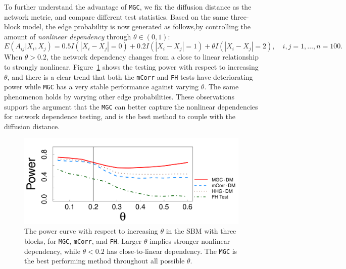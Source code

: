 \documentclass[11pt]{article}
\theoremstyle{definition}
\begin{document}
	To further understand the advantage of \texttt{MGC}, we fix the diffusion distance as the network metric, and compare different test statistics. Based on the same three-block model, the edge probability is now generated as follows,by controlling the amount of \textit{nonlinear dependency} through $\theta \in (0, 1)$:
	\begin{equation}
	E(A_{ij} | X_{i}, X_{j}) = 0.5 I(|X_{i} - X_{j}| = 0) + 0.2 I(|X_{i} - X_{j}| = 1) + \theta I(|X_{i} - X_{j}| = 2), \quad i,j = 1, \ldots, n = 100.
	\label{eq:mono}
	\end{equation}
	When $\theta > 0.2$, the network dependency changes from a close to linear relationship to strongly nonlinear. Figure~\ref{fig:powerplot} shows the testing power with respect to increasing $\theta$, and there is a clear trend that both the \texttt{mCorr} and \texttt{FH} tests have deteriorating power while \texttt{MGC} has a very stable performance against varying $\theta$. The same phenomenon holds by varying other edge probabilities. These observations support the argument that the \texttt{MGC} can better capture the nonlinear dependencies for network dependence testing, and is the best method to couple with the diffusion distance.
	\begin{figure}[ht]
		\centering
		\includegraphics[width=0.7\linewidth]{mono.pdf}
		\caption{The power curve with respect to increasing $\theta$ in the SBM with three blocks, for \texttt{MGC}, \texttt{mCorr}, and \texttt{FH}. Larger $\theta$ implies stronger nonlinear dependency, while $\theta<0.2$ has close-to-linear dependency. The \texttt{MGC} is the best performing method throughout all possible $\theta$.} 
		\label{fig:powerplot}
	\end{figure}
		
\end{document}
